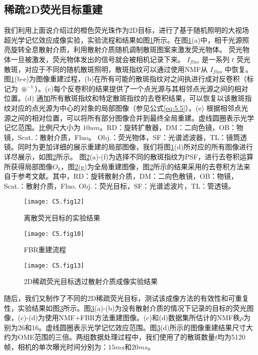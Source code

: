 \subsection{稀疏2D荧光目标重建}
我们利用上面说介绍过的橙色荧光珠作为2D目标，进行了基于随机照明的大视场超光学记忆效应成像实验，实验流程和结果如图\ref{fig:5.12}所示。在图\ref{fig:5.12}(a)中，相干光源照亮旋转全息散射介质，利用散射介质随机调制散斑图案来激发荧光物体。 荧光物体一旦被激发，荧光物体发出的信号就会被相机记录下来。 $I_{fluo}$ 是一系列 $t$ 荧光散斑，对应于不同的随机散斑照明，散斑指纹可以通过使用NMF从 $I_{fluo}$ 中恢复。图\ref{fig:5.12}(b-e)为图像重建过程，(b)在所有可能的散斑指纹对之间执进行成对反卷积（标记为 $\circledast^{-1}$）。(c)每个反卷积的结果提供了一个点光源与其相邻点光源之间的相对位置。(d) 通加所有散斑指纹和特定散斑指纹的去卷积结果，可以恢复以该散斑指纹对应的点光源为中心的对象的局部图像（参见公式\ref{eq:5.5}）。(e) 根据相邻点光源之间的相对位置，可以将所有部分图像合并到最终全局重建。虚线圆圈表示光学记忆范围。比例尺大小为 $10 um$。RD：旋转扩散器，DM：二向色镜，OB：物镜，Scat.：散射介质，Fluo。 Obj.：荧光物体，SF：光谱滤波器，TL：镜筒透镜。同时为更加详细的展示重建的局部图像，我们将图\ref{fig:5.12}(d)所对应的所有图像进行详尽展示，如图\ref{fig:5.10}所示。
图\ref{fig:5.10}(a)-(f)为选择不同的散斑指纹为PSF，进行去卷积运算所获得局部图像$O_{k}$，图\ref{fig:5.10}(g)为全局重建图像，图\ref{fig:5.10}所示的结果采用的去卷积方法来自于参考文献\cite{Chan2011}。其中，RD：旋转散射介质，DM：二向色散镜，OB：物镜，Scat.：散射介质，Fluo. Obj.：荧光目标，SF：光谱滤波片，TL：管透镜。

\begin{figure}[htp]
	\centering
	\texttt{[image: C5.fig12]}
	\caption{离散荧光目标的实验结果}
	\label{fig:5.12}
\end{figure}

\begin{figure}[htp]
	\centering
	\texttt{[image: C5.fig10]}
	\caption{FBR重建流程}
	\label{fig:5.10}
\end{figure}

\begin{figure}[htp]
	\centering
	\texttt{[image: C5.fig13]}
	\caption{2D稀疏荧光目标透过散射介质成像实验结果}
	\label{fig:5.13}
\end{figure}

随后，我们又制作了不同的2D稀疏荧光目标，测试该成像方法的有效性和可重复性，实验结果如图\ref{fig:5.13}所示。图\ref{fig:5.13}(a)-(b)为没有散射介质的情况下记录的目标的荧光图像，(c)-(d)为使用NMF+FBR方法重建图像。(c)和(d)数据集所估计的NMF秩$\rho$为别为26和16。虚线圆圈表示光学记忆效应范围。图\ref{fig:5.13}(d)所示的图像重建结果尺寸大约为OME范围的三倍。两组数据处理过程中，我们使用了的散斑数量$t$均为5120帧，相机的单次曝光时间分别为：$15ms$和$20 ms$。


